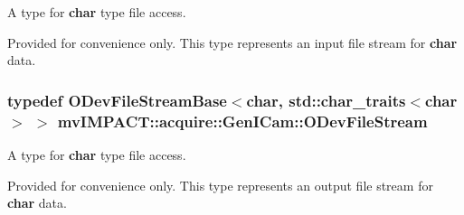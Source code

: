 A type for {\bfseries char} type file access. 

Provided for convenience only. This type represents an input file stream for {\bfseries char} data. \hypertarget{group___gen_i_cam_interface_file_stream_ga7d9df27b854d193a06556bda6f1a9488}{
\subsubsection[{O\+Dev\+File\+Stream}]{\setlength{\rightskip}{0pt plus 5cm}typedef O\+Dev\+File\+Stream\+Base$<$char, std\+::char\+\_\+traits$<$char$>$ $>$ {\bf mv\+I\+M\+P\+A\+C\+T\+::acquire\+::\+Gen\+I\+Cam\+::\+O\+Dev\+File\+Stream}}}\label{group___gen_i_cam_interface_file_stream_ga7d9df27b854d193a06556bda6f1a9488}


A type for {\bfseries char} type file access. 

Provided for convenience only. This type represents an output file stream for {\bfseries char} data. 
